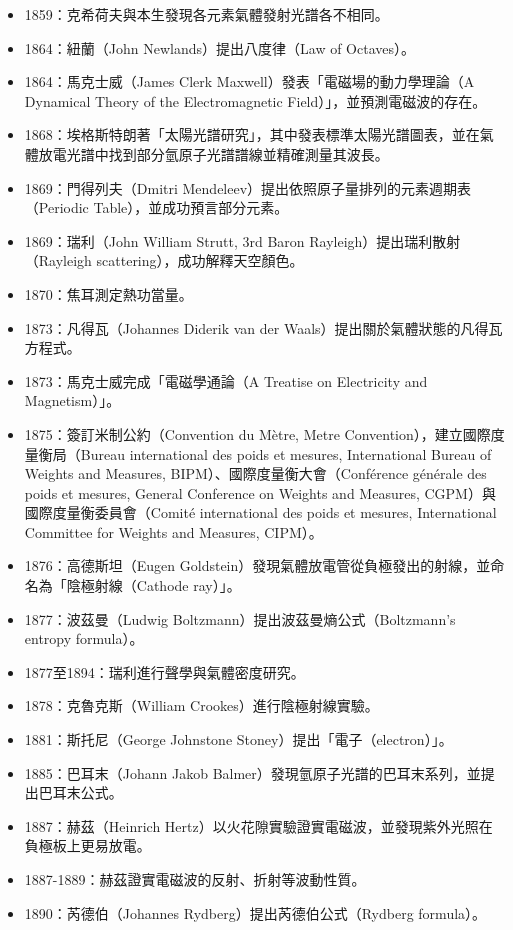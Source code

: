 \documentclass[a4paper,12pt]{article}
\begin{document}
\begin{itemize}
\item 1859：克希荷夫與本生發現各元素氣體發射光譜各不相同。
\item 1864：紐蘭（John Newlands）提出八度律（Law of Octaves）。
\item 1864：馬克士威（James Clerk Maxwell）發表「電磁場的動力學理論（A Dynamical Theory of the Electromagnetic Field）」，並預測電磁波的存在。
\item 1868：埃格斯特朗著「太陽光譜研究」，其中發表標準太陽光譜圖表，並在氣體放電光譜中找到部分氫原子光譜譜線並精確測量其波長。
\item 1869：門得列夫（Dmitri Mendeleev）提出依照原子量排列的元素週期表（Periodic Table），並成功預言部分元素。
\item 1869：瑞利（John William Strutt, 3rd Baron Rayleigh）提出瑞利散射（Rayleigh  scattering），成功解釋天空顏色。
\item 1870：焦耳測定熱功當量。
\item 1873：凡得瓦（Johannes Diderik van der Waals）提出關於氣體狀態的凡得瓦方程式。
\item 1873：馬克士威完成「電磁學通論（A Treatise on Electricity and Magnetism）」。
\item 1875：簽訂米制公約（Convention du Mètre, Metre Convention），建立國際度量衡局（Bureau international des poids et mesures, International Bureau of Weights and Measures, BIPM）、國際度量衡大會（Conférence générale des poids et mesures, General Conference on Weights and Measures, CGPM）與國際度量衡委員會（Comité international des poids et mesures, International Committee for Weights and Measures, CIPM）。
\item 1876：高德斯坦（Eugen Goldstein）發現氣體放電管從負極發出的射線，並命名為「陰極射線（Cathode ray）」。
\item 1877：波茲曼（Ludwig Boltzmann）提出波茲曼熵公式（Boltzmann's entropy formula）。
\item 1877至1894：瑞利進行聲學與氣體密度研究。
\item 1878：克魯克斯（William Crookes）進行陰極射線實驗。
\item 1881：斯托尼（George Johnstone Stoney）提出「電子（electron）」。
\item 1885：巴耳末（Johann Jakob Balmer）發現氫原子光譜的巴耳末系列，並提出巴耳末公式。
\item 1887：赫茲（Heinrich Hertz）以火花隙實驗證實電磁波，並發現紫外光照在負極板上更易放電。
\item 1887-1889：赫茲證實電磁波的反射、折射等波動性質。
\item 1890：芮德伯（Johannes Rydberg）提出芮德伯公式（Rydberg formula）。

\end{itemize}
\end{document}
